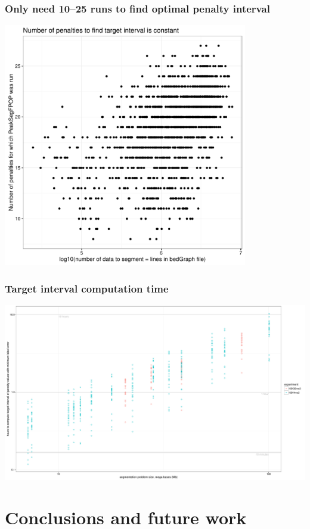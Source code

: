 \documentclass{beamer}
\begin{document}
\begin{frame}
  \frametitle{Only need 10--25 runs to find optimal penalty interval}
  \includegraphics[width=0.8\textwidth]{figure-timing-data-penalties}
\end{frame}

\begin{frame}
  \frametitle{Target interval computation time}
  \includegraphics[width=\textwidth]{figure-target-interval-time}
\end{frame}

\section{Conclusions and future work}
\end{document}
